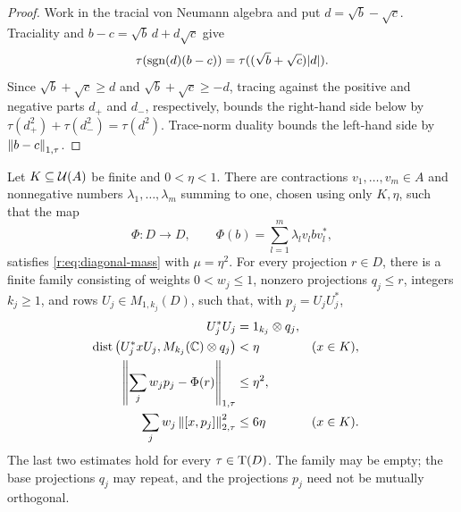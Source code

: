 \begin{proof}
Work in the tracial von Neumann algebra and put \(d=\sqrt b-\sqrt c\).
Traciality and \(b-c=\sqrt b\,d+d\sqrt c\) give
\[
 \tau(\operatorname{sgn}(d)(b-c))=\tau((\sqrt b+\sqrt c)|d|).
\]
Since \(\sqrt b+\sqrt c\geq d\) and
\(\sqrt b+\sqrt c\geq-d\), tracing against the positive and negative
parts \(d_+\) and \(d_-\), respectively, bounds the right-hand side
below by \(\tau(d_+^2)+\tau(d_-^2)=\tau(d^2)\).
Trace-norm duality bounds the left-hand side by
\(\left\|b-c\right\|_{1,\tau}\).
\end{proof}

\begin{proposition}\label{r:weighted:family}
Let \(K\subseteq\mathcal U(A)\) be finite and \(0<\eta<1\).
There are contractions \(v_1,\ldots,v_m\in A\) and nonnegative numbers
\(\lambda_1,\ldots,\lambda_m\) summing to one, chosen using only
\(K,\eta\), such that the map
\begin{equation}\label{r:eq:averaging-map}
 \Phi:D\longrightarrow D,\qquad
 \Phi(b)=\sum_{l=1}^m\lambda_l v_lbv_l^*,
\end{equation}
satisfies \eqref{r:eq:diagonal-mass} with \(\mu=\eta^2\).
For every projection \(r\in D\), there is a finite family consisting of
weights \(0<w_j\leq1\), nonzero projections \(q_j\leq r\), integers
\(k_j\geq1\), and rows \(U_j\in M_{1,k_j}(D)\), such that, with
\(p_j=U_jU_j^*\),
\begin{align}
 U_j^*U_j&=1_{k_j}\otimes q_j,\label{r:eq:block-isometry}\\
 \operatorname{dist}\big(U_j^*xU_j,M_{k_j}(\mathbb C)\otimes q_j\big)&<\eta
       &&(x\in K),\label{r:eq:block-compression}\\
 \left\|\sum_jw_jp_j-\Phi(r)\right\|_{1,\tau}&\leq\eta^2,
       \label{r:eq:block-mass}\\
 \sum_jw_j\left\|[x,p_j]\right\|_{2,\tau}^2&\leq6\eta
       &&(x\in K).\label{r:eq:block-energy}
\end{align}
The last two estimates hold for every \(\tau\in\operatorname T(D)\). The family may
be empty; the base projections \(q_j\) may repeat, and the projections
\(p_j\) need not be mutually orthogonal.
\end{proposition}

